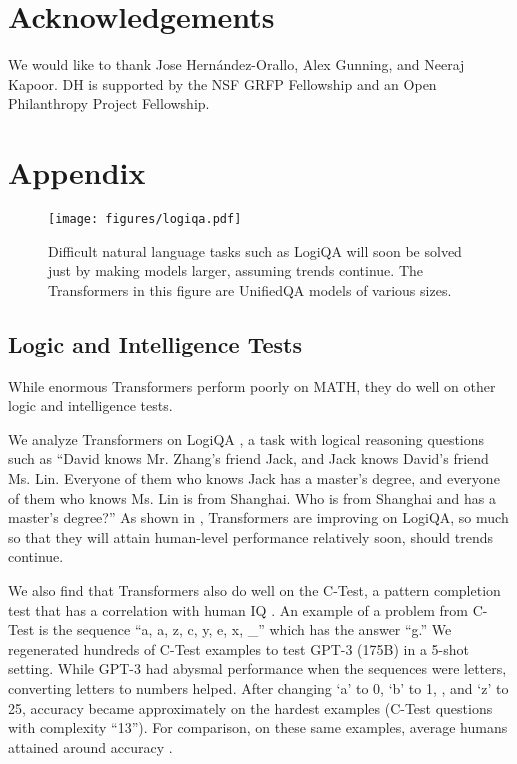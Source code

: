 \documentclass{article}
\begin{document}
\newpage
\section*{Acknowledgements}
We would like to thank Jose Hern{\'a}ndez-Orallo, Alex Gunning, and Neeraj Kapoor. DH is supported by the NSF GRFP Fellowship and an Open Philanthropy Project Fellowship. 







\newpage
\appendix
\section{Appendix}

\begin{figure}[h]
    \centering
    \texttt{[image: figures/logiqa.pdf]}
    \caption{Difficult natural language tasks such as LogiQA will soon be solved just by making models larger, assuming trends continue. The Transformers in this figure are UnifiedQA \citep{khashabi2020unifiedqa} models of various sizes.}
    \label{fig:logiqa}
\end{figure}

\subsection{Logic and Intelligence Tests}\label{app:iq}
While enormous Transformers perform poorly on MATH, they do well on other logic and intelligence tests.

We analyze Transformers on LogiQA \citep{Liu2020LogiQAAC}, a task with logical reasoning questions such as ``David knows Mr. Zhang's friend Jack, and Jack knows David's friend Ms. Lin. Everyone of them who knows Jack has a master's degree, and everyone of them who knows Ms. Lin is from Shanghai. Who is from Shanghai and has a master's degree?'' As shown in , Transformers are improving on LogiQA, so much so that they will attain human-level performance relatively soon, should trends continue. 

We also find that Transformers also do well on the C-Test, a pattern completion test that has a  correlation with human IQ \citep{HernndezOrallo2000BeyondTT}. An example of a problem from C-Test is the sequence ``a, a, z, c, y, e, x, \_'' which has the answer ``g.'' We regenerated hundreds of C-Test examples to test GPT-3 (175B) in a 5-shot setting. While GPT-3 had abysmal performance when the sequences were letters, converting letters to numbers helped. After changing `a' to 0, `b' to 1, , and `z' to 25, accuracy became approximately  on the hardest examples (C-Test questions with complexity ``13''). For comparison, on these same examples, average humans attained around  accuracy \citep{HernndezOrallo2000BeyondTT}.
\end{document}
